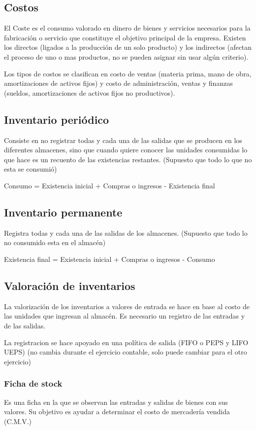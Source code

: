 \documentclass[titlepage,a4paper]{article}
\begin{document}
\subsection*{Costos}
El Coste es el consumo valorado en dinero de bienes y servicios necesarios para la fabricación o servicio que constituye el objetivo principal de la empresa. Existen los directos (ligados a la producción de un solo producto) y los indirectos (afectan el proceso de uno o mas productos, no se pueden asignar sin usar algún criterio).

Los tipos de costos se clasifican en costo de ventas (materia prima, mano de obra, amortizaciones de activos fijos) y costo de administración, ventas y finanzas (sueldos, amortizaciones de activos fijos no productivos).

\subsection*{Inventario periódico}
Consiste en no registrar todas y cada una de las salidas que se producen en los diferentes almacenes, sino que cuando quiere conocer las unidades consumidas lo que hace es un recuento de las existencias restantes. (Supuesto que todo lo que no esta se consumió)

Consumo = Existencia inicial + Compras o ingresos - Existencia final


\subsection*{Inventario permanente}
Registra todas y cada una de las salidas de los almacenes. (Supuesto que todo lo no consumido esta en el almacén)

Existencia final = Existencia inicial + Compras o ingresos - Consumo


\subsection*{Valoración de inventarios}
La valorización de los inventarios a valores de entrada se hace en base al costo de las unidades que ingresan al almacén. Es necesario un registro de las entradas y de las salidas.

La registracion se hace apoyado en una política de salida (FIFO o PEPS y LIFO UEPS) (no cambia durante el ejercicio contable, solo puede cambiar para el otro ejercicio)


\subsubsection*{Ficha de stock}
Es una ficha en la que se observan las entradas y salidas de bienes con sus valores. Su objetivo es ayudar a determinar el costo de mercadería vendida (C.M.V.)
\end{document}
